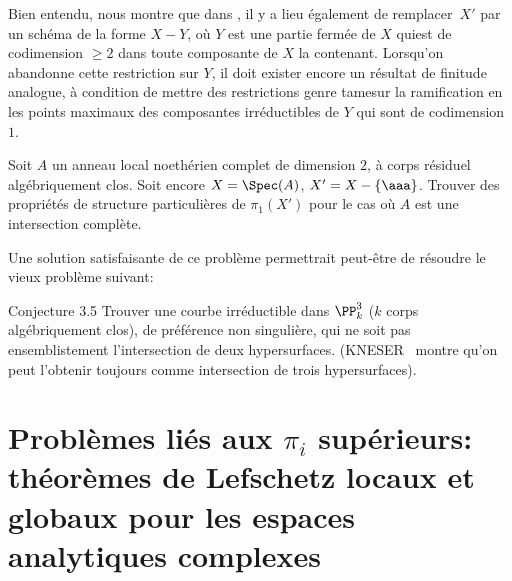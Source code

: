 Bien entendu,  nous montre que dans , il y a lieu \'egalement de remplacer~$X'$ par un sch\'ema de la forme $X-Y$, o\`u $Y$ est une partie ferm\'ee de $X$ qui\pageoriginale est de codimension $\ge 2$ dans toute composante de $X$ la contenant. Lorsqu'on abandonne cette restriction sur $Y$, il doit exister encore un r\'esultat de finitude analogue, \`a condition de mettre des restrictions genre \og tame\fg sur la ramification en les points maximaux des composantes irr\'eductibles de $Y$ qui sont de codimension $1$.

\begin{probleme} \label{XIII.3.4}
Soit $A$ un anneau local noeth\'erien complet de dimension $2$, \`a corps r\'esiduel alg\'ebriquement clos. Soit encore $X=\Spec(A)$, $X'=X-\{\aaa\}$. Trouver des propri\'et\'es de structure particuli\`eres de $\pi_1(X')$ pour le cas o\`u $A$ est une intersection compl\`ete.
\end{probleme}

Une solution satisfaisante de ce probl\`eme permettrait peut-\^etre de r\'esoudre le vieux probl\`eme suivant:

\label{XIII.3.5}
\begin{enonce*}{Conjecture 3.5\ndemark} Trouver une courbe irr\'eductible dans $\PP^3_k$ ($k$ corps alg\'ebriquement clos), de pr\'ef\'erence non singuli\`ere, qui ne soit pas ensemblistement l'intersection de deux hypersurfaces. (KNESER~\cite{XIII.4} montre qu'on peut l'obtenir toujours comme intersection de trois hypersurfaces).
\end{enonce*}
\ignorespaces

\section[Probl\`emes li\'es aux $\pi_i$ sup\'erieurs]{Probl\`emes li\'es aux $\pi_i$ sup\'erieurs: th\'eor\`emes de Lefschetz locaux et globaux pour les espaces analytiques complexes\protect\ndemark} \label{XIII.4}

